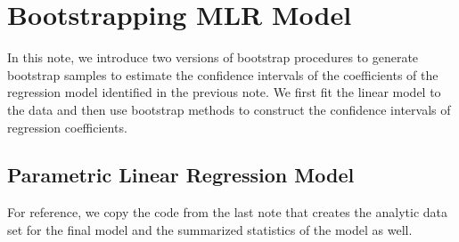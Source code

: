 \documentclass[
]{book}
\begin{document}
\hypertarget{bootstrapping-mlr-model}{%
\chapter{Bootstrapping MLR Model}\label{bootstrapping-mlr-model}}

In this note, we introduce two versions of bootstrap procedures to generate bootstrap samples to estimate the confidence intervals of the coefficients of the regression model identified in the previous note. We first fit the linear model to the data and then use bootstrap methods to construct the confidence intervals of regression coefficients.

\hypertarget{parametric-linear-regression-model}{%
\section{Parametric Linear Regression Model}\label{parametric-linear-regression-model}}

For reference, we copy the code from the last note that creates the analytic data set for the final model and the summarized statistics of the model as well.
\end{document}
